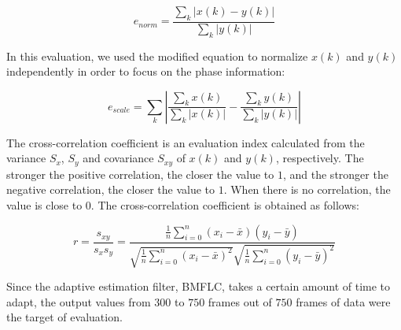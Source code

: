 \begin{equation}
  \label{equ:WMAPE_origin}
  e_{\mathit{norm}} = \frac{\sum_{k} \left| x(k)-y(k) \right| }{\sum_{k} \left| y(k)  \right|}   
\end{equation}



In this evaluation,
we used the modified equation to normalize $x(k)$ and $y(k)$ independently in order to focus on the phase information:


\begin{equation}
  \label{equ:WMAPE}
  e_{\mathit{scale}} =  \sum_{k}  \left| \frac{\sum_{k} x(k)}{\sum_{k} |x(k)|}  - \frac{\sum_{k} y(k)}{\sum_{k} |y(k)|} \right|    
\end{equation}



The cross-correlation coefficient is an evaluation index calculated from the variance $S_x$, $S_y$
and covariance $S_{xy}$ of $x(k)$ and $y(k)$, respectively.
The stronger the positive correlation, the closer the value to $1$, and the stronger the negative correlation,
the closer the value to $1$. When there is no correlation,
the value is close to $0$. The cross-correlation coefficient is obtained as follows:

\begin{equation}
  \label{equ:cross-correlation}
  r= \frac{s_{xy}}{s_xs_y}
  =\frac{\frac{1}{n} \sum_{i=0}^{n}(x_i - \bar{x})(y_i - \bar{y})}
  {\sqrt{\frac{1}{n} \sum_{i=0}^{n}(x_i-\bar{x})^2}\sqrt{\frac{1}{n} \sum_{i=0}^{n}(y_i-\bar{y})^2}}    
\end{equation}




Since the adaptive estimation filter, BMFLC, takes a certain amount of time to adapt,
the output values from $300$ to $750$ frames out of $750$ frames of data were the target of evaluation.



